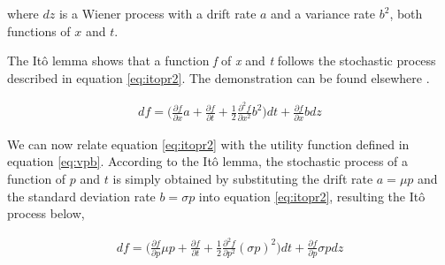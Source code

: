 \documentclass[11pt, onecolumn]{article}
\begin{document}
where $dz$ is a Wiener process with a drift rate $a$ and a variance rate $b^2$, both functions of $x$ and $t$.

The It\^{o} lemma shows that a function \emph{f} of \emph{x} and \emph{t} follows the stochastic process described in equation \ref{eq:itopr2}. The demonstration can be found elsewhere \citep{shreve_stochastic_2010}.

\begin{equation}
\begin{split}
   df = \bigg(\frac{\partial f}{\partial x} a  + \frac{\partial f}{\partial t} + \frac{1}{2}\frac{\partial ^2 f}{\partial x^2} b^2 \bigg)dt + \frac{\partial f}{\partial x}b dz
\end{split}
\label{eq:itopr2}
\end{equation}

We can now relate equation \ref{eq:itopr2} with the utility function defined in equation \ref{eq:vpb}. According to the It\^{o} lemma, the stochastic process of a function of $p$ and $t$ is simply obtained by substituting the drift rate $a = \mu p$ and the standard deviation rate $b = \sigma p$ into equation \ref{eq:itopr2}, resulting the It\^{o} process below,

\begin{equation}
\begin{split}
   df = \bigg(\frac{\partial f}{\partial p} \mu p  + \frac{\partial f}{\partial t} + \frac{1}{2}\frac{\partial ^2 f}{\partial p^2} (\sigma p)^2 \bigg)dt + \frac{\partial f}{\partial p}\sigma p dz
\end{split}
\label{eq:itopr3}
\end{equation}
\end{document}
